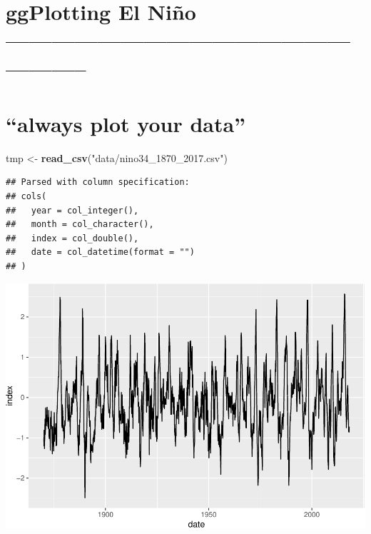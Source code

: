 \documentclass[]{article}
\newenvironment{Shaded}{\begin{snugshade}}{\end{snugshade}}
\newcommand{\CommentTok}[1]{\textcolor[rgb]{0.56,0.35,0.01}{\textit{#1}}}
\newcommand{\DataTypeTok}[1]{\textcolor[rgb]{0.13,0.29,0.53}{#1}}
\newcommand{\KeywordTok}[1]{\textcolor[rgb]{0.13,0.29,0.53}{\textbf{#1}}}
\newcommand{\NormalTok}[1]{#1}
\newcommand{\OperatorTok}[1]{\textcolor[rgb]{0.81,0.36,0.00}{\textbf{#1}}}
\newcommand{\StringTok}[1]{\textcolor[rgb]{0.31,0.60,0.02}{#1}}
\begin{document}
\hypertarget{ggplotting-el-nino}{%
\section{ggPlotting El Niño
--------------------------------------------------------}\label{ggplotting-el-nino}}

\hypertarget{always-plot-your-data}{%
\section{``always plot your data''}\label{always-plot-your-data}}

\begin{Shaded}
\begin{Highlighting}[]
\NormalTok{tmp <-}\StringTok{ }\KeywordTok{read_csv}\NormalTok{(}\StringTok{"data/nino34_1870_2017.csv"}\NormalTok{)}
\end{Highlighting}
\end{Shaded}

\begin{verbatim}
## Parsed with column specification:
## cols(
##   year = col_integer(),
##   month = col_character(),
##   index = col_double(),
##   date = col_datetime(format = "")
## )
\end{verbatim}

\begin{Shaded}
\end{Shaded}

\includegraphics{R_tidyverse_for_geographers_files/figure-latex/unnamed-chunk-14-1.pdf}
\end{document}
